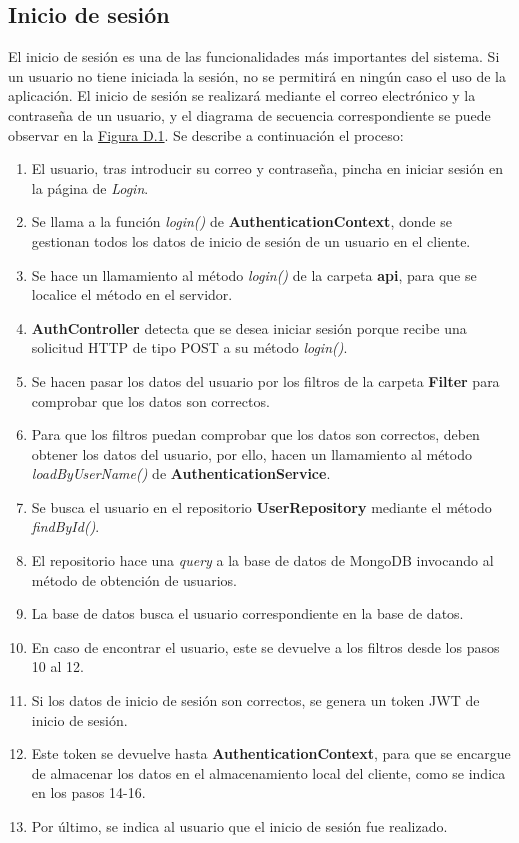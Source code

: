 \subsection{Inicio de sesión}

El inicio de sesión es una de las funcionalidades más importantes del sistema. Si un usuario no tiene iniciada la sesión, no se permitirá en ningún caso el uso de la aplicación. El inicio de sesión se realizará mediante el correo electrónico y la contraseña de un usuario, y el diagrama de secuencia correspondiente se puede observar en la \hyperref[enlaceDInicioSesion]{Figura D.1}. Se describe a continuación el proceso:

\begin{enumerate}
    \item El usuario, tras introducir su correo y contraseña, pincha en iniciar sesión en la página de {\it Login}.
    \item Se llama a la función {\it login()} de {\bf AuthenticationContext}, donde se gestionan todos los datos de inicio de sesión de un usuario en el cliente.
    \item Se hace un llamamiento al método {\it login()} de la carpeta {\bf api}, para que se localice el método en el servidor.
    \item {\bf AuthController} detecta que se desea iniciar sesión porque recibe una solicitud HTTP de tipo POST a su método {\it login()}.
    \item Se hacen pasar los datos del usuario por los filtros de la carpeta {\bf Filter} para comprobar que los datos son correctos.
    \item Para que los filtros puedan comprobar que los datos son correctos, deben obtener los datos del usuario, por ello, hacen un llamamiento al método {\it loadByUserName()} de {\bf AuthenticationService}.
    \item Se busca el usuario en el repositorio {\bf UserRepository} mediante el método {\it findById()}.
    \item El repositorio hace una {\it query} a la base de datos de MongoDB invocando al método de obtención de usuarios.
    \item La base de datos busca el usuario correspondiente en la base de datos.
    \item En caso de encontrar el usuario, este se devuelve a los filtros desde los pasos 10 al 12.
    \item Si los datos de inicio de sesión son correctos, se genera un token JWT de inicio de sesión.
    \item Este token se devuelve hasta {\bf AuthenticationContext}, para que se encargue de almacenar los datos en el almacenamiento local del cliente, como se indica en los pasos 14-16.
    \item Por último, se indica al usuario que el inicio de sesión fue realizado.
\end{enumerate}